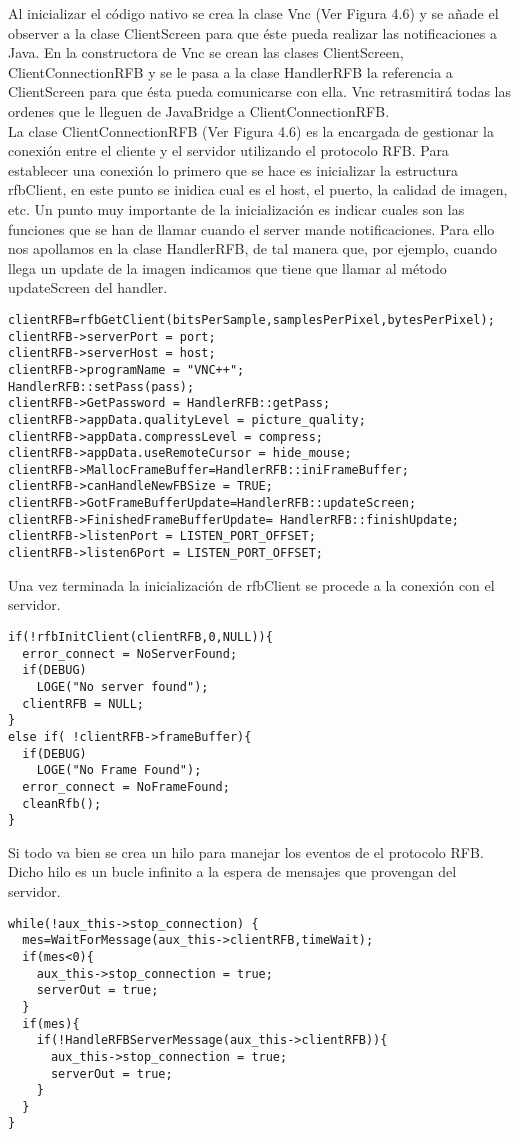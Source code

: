Al inicializar el código nativo se crea la clase Vnc (Ver Figura 4.6) y se añade el observer a la clase ClientScreen para que éste pueda realizar las notificaciones a Java. En la constructora de Vnc se crean las clases ClientScreen, ClientConnectionRFB y se le pasa a la clase HandlerRFB la referencia a ClientScreen para que ésta pueda comunicarse con ella. Vnc retrasmitirá todas las ordenes que le lleguen de JavaBridge a ClientConnectionRFB.\\

La clase ClientConnectionRFB (Ver Figura 4.6) es la encargada de gestionar la conexión entre el cliente y el servidor utilizando el protocolo RFB. Para establecer una conexión lo primero que se hace es inicializar la estructura rfbClient, en este punto se inidica cual es el host, el puerto, la calidad de imagen, etc. Un punto muy importante de la inicialización es indicar cuales son las funciones que se han de llamar cuando el server mande notificaciones. Para ello nos apollamos en la clase HandlerRFB, de tal manera que, por ejemplo, cuando llega un update de la imagen indicamos que tiene que llamar al método updateScreen del handler.
\begin{lstlisting}
clientRFB=rfbGetClient(bitsPerSample,samplesPerPixel,bytesPerPixel);
clientRFB->serverPort = port;
clientRFB->serverHost = host;
clientRFB->programName = "VNC++";
HandlerRFB::setPass(pass);
clientRFB->GetPassword = HandlerRFB::getPass;
clientRFB->appData.qualityLevel = picture_quality;
clientRFB->appData.compressLevel = compress;
clientRFB->appData.useRemoteCursor = hide_mouse;
clientRFB->MallocFrameBuffer=HandlerRFB::iniFrameBuffer;
clientRFB->canHandleNewFBSize = TRUE;
clientRFB->GotFrameBufferUpdate=HandlerRFB::updateScreen;
clientRFB->FinishedFrameBufferUpdate= HandlerRFB::finishUpdate;
clientRFB->listenPort = LISTEN_PORT_OFFSET;
clientRFB->listen6Port = LISTEN_PORT_OFFSET;
\end{lstlisting}

Una vez terminada la inicialización de rfbClient se procede a la conexión con el servidor.
\begin{lstlisting}
if(!rfbInitClient(clientRFB,0,NULL)){
  error_connect = NoServerFound;
  if(DEBUG)
    LOGE("No server found");
  clientRFB = NULL;
}
else if( !clientRFB->frameBuffer){
  if(DEBUG)
    LOGE("No Frame Found");
  error_connect = NoFrameFound;
  cleanRfb();
}
\end{lstlisting}

Si todo va bien se crea un hilo para manejar los eventos de el protocolo RFB. Dicho hilo es un bucle infinito a la espera de mensajes que provengan del servidor.
\begin{lstlisting}
while(!aux_this->stop_connection) {
  mes=WaitForMessage(aux_this->clientRFB,timeWait);
  if(mes<0){
    aux_this->stop_connection = true;
    serverOut = true;
  }
  if(mes){
    if(!HandleRFBServerMessage(aux_this->clientRFB)){
      aux_this->stop_connection = true;
      serverOut = true;
    }
  }
}
\end{lstlisting}

